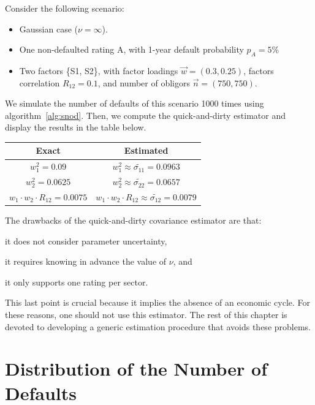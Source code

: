 \documentclass[11pt,fleqn]{book} %
\begin{document}
\begin{example}
	Consider the following scenario:
	\begin{itemize}
		\item Gaussian case ($\nu = \infty$).
		\item One non-defaulted rating A, with 1-year default probability $p_A=5\%$
		\item Two factors \{S1, S2\}, with factor loadings $\vec{w} = (0.3, 0.25)$, 
		factors correlation $R_{12} = 0.1$, and number of obligors $\vec{n} = (750, 750)$.
	\end{itemize}
	We simulate the number of defaults of this scenario 1000 times using 
	algorithm~\ref{alg:snod}. Then, we compute the quick-and-dirty estimator 
	and display the results in the table below.

	\hspace*{1cm}
	\begin{tabular}{|c|c|}
		\hline
		Exact & Estimated \\
		\hline
		$w_1^2 = 0.09$ & $w_1^2 \approx \widetilde{\sigma_{11}} = 0.0963$ \\
		\hline
		$w_2^2 = 0.0625$ & $w_2^2 \approx \widetilde{\sigma_{22}} = 0.0657$ \\
		\hline
		$w_1 \cdot w_2 \cdot R_{12} = 0.0075$ & $w_1 \cdot w_2 \cdot R_{12} \approx \widetilde{\sigma_{12}} = 0.0079$ \\
		\hline
	\end{tabular}
\end{example}

The drawbacks of the quick-and-dirty covariance estimator are that:
\begin{inparaenum}[1)]
	\item it does not consider parameter uncertainty, 
	\item it requires knowing in advance the value of $\nu$, and
	\item it only supports one rating per sector.
\end{inparaenum}
This last point is crucial because it implies the absence of an economic 
cycle. For these reasons, one should not use this estimator. The rest of 
this chapter is devoted to developing a generic estimation procedure that 
avoids these problems.

\section{Distribution of the Number of Defaults}
\end{document}
